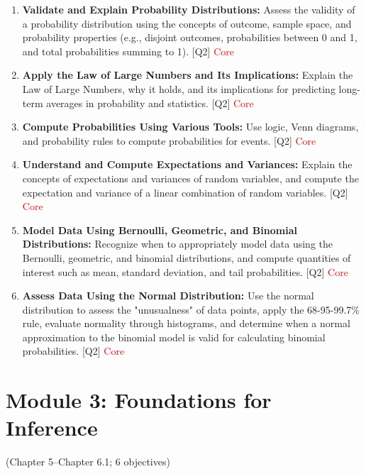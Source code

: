 \documentclass[12pt]{article}
\begin{document}
\begin{enumerate}
    \item \textbf{Validate and Explain Probability Distributions:} Assess the validity of a probability distribution using the concepts of outcome, sample space, and probability properties (e.g., disjoint outcomes, probabilities between 0 and 1, and total probabilities summing to 1). [Q2]  \textcolor{red}{Core}
    \item \textbf{Apply the Law of Large Numbers and Its Implications:} Explain the Law of Large Numbers, why it holds, and its implications for predicting long-term averages in probability and statistics. [Q2] \textcolor{red}{Core}
    \item \textbf{Compute Probabilities Using Various Tools:} Use logic, Venn diagrams, and probability rules to compute probabilities for events. [Q2] \textcolor{red}{Core}
    \item \textbf{Understand and Compute Expectations and Variances:} Explain the concepts of expectations and variances of random variables, and compute the expectation and variance of a linear combination of random variables. [Q2] \textcolor{red}{Core} 
    \item \textbf{Model Data Using Bernoulli, Geometric, and Binomial Distributions:} Recognize when to appropriately model data using the Bernoulli, geometric, and binomial distributions, and compute quantities of interest such as mean, standard deviation, and tail probabilities. [Q2] \textcolor{red}{Core}
    \item \textbf{Assess Data Using the Normal Distribution:} Use the normal distribution to assess the "unusualness" of data points, apply the 68-95-99.7\% rule, evaluate normality through histograms, and determine when a normal approximation to the binomial model is valid for calculating binomial probabilities. [Q2] \textcolor{red}{Core}
\end{enumerate}

\newpage


\section{Module 3: Foundations for Inference}
(Chapter 5--Chapter 6.1; 6 objectives)

\end{document}
